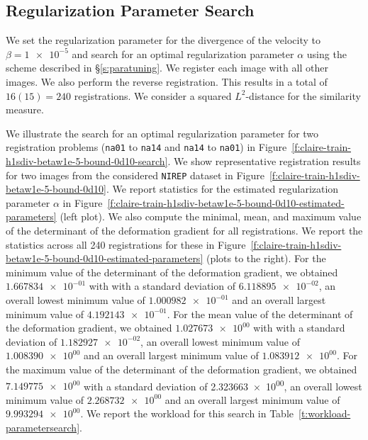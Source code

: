 \documentclass[11pt]{amsart}
\newcommand{\figref}[1]{Figure~\ref{#1}}
\newcommand{\tabref}[1]{Table~\ref{#1}}
\newcommand{\secref}[1]{\S\ref{#1}}
\newcommand\snum[1]{\num[round-precision=3,round-mode=places,tight-spacing=true,retain-zero-exponent=true,retain-explicit-plus=true,output-exponent-marker=\text{e}]{#1}}
\newcommand\scinum[1]{\num[round-precision=0,round-mode=places,tight-spacing=true,retain-zero-exponent=true,retain-explicit-plus=true,output-exponent-marker=\text{e}]{#1}}
\begin{document}
\subsection{Regularization Parameter Search}

We set the regularization parameter for the divergence of the velocity to $\beta = \scinum{1e-5}$ and search for an optimal regularization parameter $\alpha$ using the scheme described in \secref{s:paratuning}. We register each image with all other images. We also perform the reverse registration. This results in a total of $16(15) = 240$ registrations. We consider a squared $L^2$-distance for the similarity measure.

We illustrate the search for an optimal regularization parameter for two registration problems ({\tt na01} to {\tt na14} and {\tt na14} to {\tt na01}) in \figref{f:claire-train-h1sdiv-betaw1e-5-bound-0d10-search}. We show representative registration results for two images from the considered {\tt NIREP} dataset in \figref{f:claire-train-h1sdiv-betaw1e-5-bound-0d10}. We report statistics for the estimated regularization parameter $\alpha$ in \figref{f:claire-train-h1sdiv-betaw1e-5-bound-0d10-estimated-parameters} (left plot). We also compute the minimal, mean, and maximum value of the determinant of the deformation gradient for all registrations. We report the statistics across all 240 registrations for these in \figref{f:claire-train-h1sdiv-betaw1e-5-bound-0d10-estimated-parameters} (plots to the right). For the minimum value of the determinant of the deformation gradient, we obtained $\snum{1.667834e-01}$ with with a standard deviation of $\snum{6.118895e-02}$, an overall lowest minimum value of $\snum{1.000982e-01}$ and an overall largest minimum value of $\snum{4.192143e-01}$. For the mean value of the determinant of the deformation gradient, we obtained $\snum{1.027673e+00}$ with with a standard deviation of $\snum{1.182927e-02}$, an overall lowest minimum value of $\snum{1.008390e+00}$ and an overall largest minimum value of $\snum{1.083912e+00}$. For the maximum value of the determinant of the deformation gradient, we obtained $\snum{7.149775e+00}$ with a standard deviation of \snum{2.323663e+00}, an overall lowest minimum value of $\snum{2.268732e+00}$ and an overall largest minimum value of $\snum{9.993294e+00}$. We report the workload for this search in \tabref{t:workload-parametersearch}.
\end{document}
